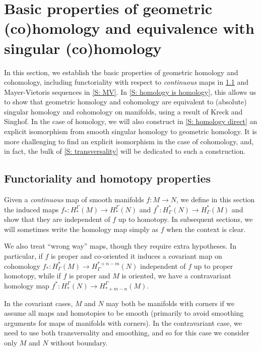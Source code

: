 
\section{Basic properties of geometric (co)homology and equivalence with singular (co)homology}\label{S: basic properties}

In this section, we establish the basic properties of geometric homology and cohomology, including functoriality with respect to \textit{continuous} maps in \cref{S: functoriality} and Mayer-Vietoris sequences in \cref{S: MV}.
In \cref{S: homology is homology}, this allows us to show that geometric homology and cohomology are equivalent to (absolute) singular homology and cohomology on manifolds, using a result of Kreck and Singhof.
In the case of homology, we will also construct in \cref{S: homology direct} an explicit isomorphism from smooth singular homology to geometric homology.
It is more challenging to find an explicit isomorphism in the case of cohomology, and, in fact, the bulk of \cref{S: transversality} will be dedicated to such a construction.

\subsection{Functoriality and homotopy properties}\label{S: functoriality}

Given a \textit{continuous} map of smooth manifolds $f \colon M \to N$, we define in this section the induced maps $f_* \colon H_*^\Gamma(M) \to H_*^\Gamma(N)$ and $f^* \colon H^*_\Gamma(N) \to H^*_\Gamma(M)$ and show that they are independent of $f$ up to homotopy.
In subsequent sections, we will sometimes write the homology map simply as $f$ when the context is clear.

We also treat ``wrong way'' maps, though they require extra hypotheses.
In particular, if $f$ is proper and co-oriented it induces a covariant map on cohomology $f_* \colon H^*_\Gamma(M) \to H^{*+n-m}_\Gamma(N)$ independent of $f$ up to proper homotopy,
while if $f$ is proper and $M$ is oriented, we have a contravariant homology map $f^* \colon H_*^\Gamma(N) \to H_{*+m-n}^\Gamma(M)$.

In the covariant cases, $M$ and $N$ may both be manifolds with corners if we assume all maps and homotopies to be smooth (primarily to avoid smoothing arguments for maps of manifolds with corners).
In the contravariant case, we need to use both transversality and smoothing, and so for this case we consider only $M$ and $N$ without boundary.

